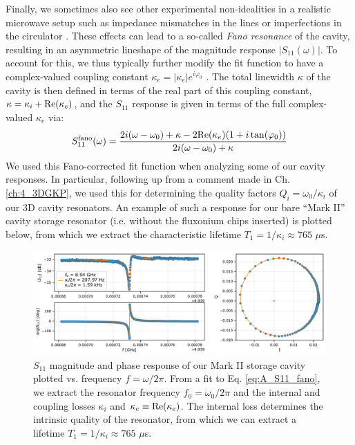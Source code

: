 Finally, we sometimes also see other experimental non-idealities in a realistic microwave setup such as impedance mismatches in the lines \cite{probst2015efficient} or imperfections in the circulator \cite{rieger2023fano}. These effects can lead to a so-called \textit{Fano resonance} of the cavity, resulting in an asymmetric lineshape of the magnitude response $|S_{11}(\omega)|$. To account for this, we thus typically further modify the fit function to have a complex-valued coupling constant $\kappa_e = |\kappa_e|e^{i\varphi_0}$ \cite{probst2015efficient}. The total linewidth $\kappa$ of the cavity is then defined  in terms of the real part of this coupling constant, $\kappa = \kappa_i + {\rm Re}(\kappa_e)$, and the $S_{11}$ response is given in terms of the full complex-valued $\kappa_e$ via:
\begin{equation}
    S_{11}^{\rm fano}(\omega) = \frac{2i(\omega-\omega_0) + \kappa -  2{\rm Re}(\kappa_e)(1+i\tan(\varphi_0))}{2i(\omega-\omega_0) + \kappa}
    \label{eq:A_S11_fano}
\end{equation}
We used this Fano-corrected fit function when analyzing some of our cavity responses. In particular, following up from a comment made in Ch. \ref{ch:4_3DGKP}, we used this for determining the quality factors $Q_i = \omega_0/\kappa_i$ of our 3D cavity resonators. An example of such a response for our bare ``Mark II'' cavity storage resonator (i.e. without the fluxonium chips inserted) is plotted below, from which we extract the characteristic lifetime $T_1 = 1/\kappa_i \approx 765$ $\mu$s. 
\begin{figure}[h]
    \centering
    \includegraphics[width=\linewidth]{Figures/A/Storage_Res_S11_Fit.pdf}
    \caption{$S_{11}$ magnitude and phase response of our Mark II storage cavity plotted vs. frequency $f = \omega/2\pi$. From a fit to Eq. \eqref{eq:A_S11_fano}, we extract the resonator frequency $f_0 = \omega_0/2\pi$ and the internal and coupling losses $\kappa_i$ and $\kappa_c \equiv {\rm Re}(\kappa_e)$. The internal loss determines the intrinsic quality of the resonator, from which we can extract a lifetime $T_1 = 1/\kappa_i \approx 765$ $\mu$s.}
    \label{fig:A_Storage_Res_S11_Fit}
\end{figure}